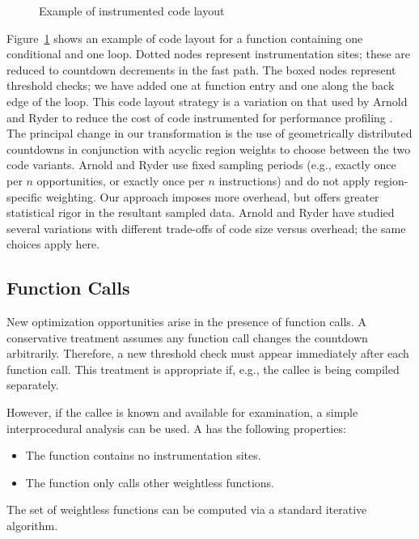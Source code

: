 \begin{figure}
  \centering
  
  \caption{Example of instrumented code layout}
  \label{fig:code-layout}
\end{figure}

Figure~\ref{fig:code-layout} shows an example of code layout for a
function containing one conditional and one loop.  Dotted nodes
represent instrumentation sites; these are reduced to countdown
decrements in the fast path.  The boxed nodes represent threshold
checks; we have added one at function entry and one along the back
edge of the loop.  This code layout strategy is a variation on that
used by Arnold and Ryder to reduce the cost of code instrumented for
performance profiling \cite{Arnold:2001:FRC}.  The principal change in
our transformation is the use of geometrically distributed countdowns
in conjunction with acyclic region weights to choose between the two
code variants.  Arnold and Ryder use fixed sampling periods (e.g.,
exactly once per $n$ opportunities, or exactly once per $n$
instructions) and do not apply region-specific weighting.  Our
approach imposes more overhead, but offers greater statistical rigor
in the resultant sampled data.  Arnold and Ryder have studied several
variations with different trade-offs of code size versus overhead;
the same choices apply here.

\subsection{Function Calls}
\label{sec:framework:calls}

New optimization opportunities arise in the presence of function
calls.  A conservative treatment assumes any function call changes the
countdown arbitrarily.  Therefore, a new threshold check must appear
immediately after each function call.  This treatment is appropriate
if, e.g., the callee is being compiled separately.

However, if the callee is known and available for examination, a
simple interprocedural analysis can be used.  A  has the following properties:

\begin{itemize}
\item The function contains no instrumentation sites.
\item The function only calls other weightless functions.
\end{itemize}

The set of weightless functions can be computed via a standard
iterative algorithm.

